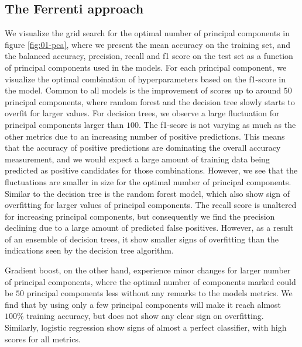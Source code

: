 \clearpage
\subsection{The Ferrenti approach}

We visualize the grid search for the optimal number of principal components in figure \ref{fig:01-pca}, where we present the mean accuracy on the training set, and the balanced accuracy, precision, recall and f1 score on the test set as a function of principal components used in the models. For each principal component, we visualize the optimal combination of hyperparameters based on the f1-score in the model. Common to all models is the improvement of scores up to around $50$ principal components, where random forest and the decision tree slowly starts to overfit for larger values. For decision trees, we observe a large fluctuation for principal components larger than $100$. The f1-score is not varying as much as the other metrics due to an increasing number of positive predictions. This means that the accuracy of positive predictions are dominating the overall accuracy measurement, and we would expect a large amount of training data being predicted as positive candidates for those combinations. However, we see that the fluctuations are smaller in size for the optimal number of principal components. Similar to the decision tree is the random forest model, which also show sign of overfitting for larger values of principal components. The recall score is unaltered for increasing principal components, but consequently we find the precision declining due to a large amount of predicted false positives.  However, as a result of an ensemble of decision trees, it show smaller signs of overfitting than the indications seen by the decision tree algorithm.

Gradient boost, on the other hand, experience minor changes for larger number of principal components, where the optimal number of components marked could be $50$ principal components less without any remarks to the models metrics. We find that by using only a few principal components will make it reach almost $100\%$ training accuracy, but does not show any clear sign on overfitting. Similarly, logistic regression show signs of almost a perfect classifier, with high scores for all metrics.

